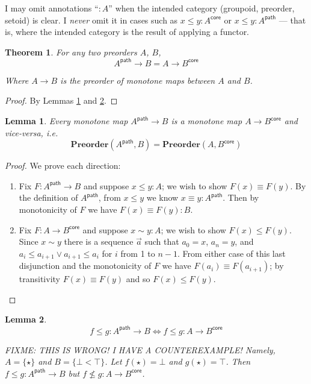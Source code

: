 \documentclass{article}
\newtheorem{theorem}{Theorem}
\newtheorem{lemma}{Lemma}
\newcommand{\ms}[1]{\ensuremath{\mathsf{#1}}}
\newcommand{\mb}[1]{\ensuremath{\mathbf{#1}}}
\newcommand{\iso}{\ms{core}}
\renewcommand{\path}{\ms{path}}
\newcommand{\pathto}{\sim}
\begin{document}
I may omit annotations ``$: A$'' when the intended category (groupoid, preorder,
setoid) is clear. I \emph{never} omit it in cases such as $x \le y : A^\iso$ or
$x \le y : A^\path$ --- that is, where the intended category is the result of
applying a functor.

\begin{theorem}\label{thm:loccore} For any two preorders $A$, $B$,
  \begin{equation}
    A^\path \to B = A \to B^\iso
  \end{equation}

  Where $A \to B$ is the preorder of monotone maps between $A$ and $B$.
\end{theorem}

\begin{proof} By Lemmas \ref{lem:loccore-1} and \ref{lem:loccore-2}.
\end{proof}

\begin{lemma}\label{lem:loccore-1}
  Every monotone map $A^\path \to B$ is a monotone map $A \to B^\iso$ and
  vice-versa, i.e.
  \[ \mb{Preorder}(A^\path, B) = \mb{Preorder}(A, B^\iso) \]
\end{lemma}

\begin{proof} We prove each direction:
  \begin{enumerate}
  \item Fix $F : A^\path \to B$ and suppose $x \le y : A$; we wish to show $F(x)
    \equiv F(y)$. By the definition of $A^\path$, from $x \le y$ we know $x
    \equiv y : A^\path$. Then by monotonicity of $F$ we have $F(x) \equiv F(y) :
    B$.

  \item Fix $F : A \to B^\iso$ and suppose $x \pathto y : A$; we wish to show
    $F(x) \le F(y)$. Since $x \pathto y$ there is a sequence $\vec{a}$ such that
    $a_0 = x$, $a_n = y$, and $a_i \le a_{i+1} \vee a_{i+1} \le a_i$ for $i$
    from 1 to $n-1$. From either case of this last disjunction and the
    monotonicity of $F$ we have $F(a_i) \equiv F(a_{i+1})$; by transitivity
    $F(x) \equiv F(y)$ and so $F(x) \le F(y)$.
  \end{enumerate}
\end{proof}

\begin{lemma}\label{lem:loccore-2}
  \color{red}
  \[f \le g : A^\path \to B \iff f \le g : A \to B^\iso \]

  \emph{FIXME: THIS IS WRONG! I HAVE A COUNTEREXAMPLE! Namely, $A = \{\star\}$
  and $B = \{\bot < \top\}$. Let $f(\star) = \bot$ and $g(\star) = \top$. Then
  $f \le g : A^\path \to B$ but $f \not\le g : A \to B^\iso$.}
\end{lemma}
\end{document}
